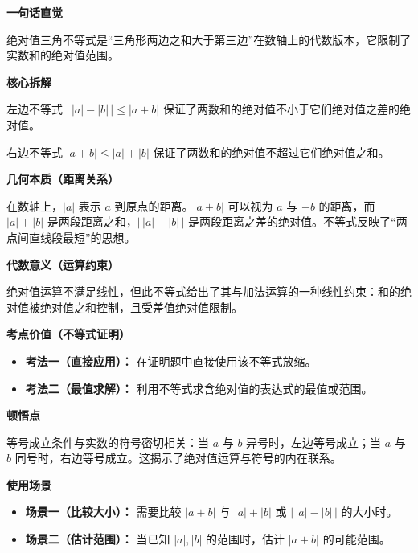 \begin{explanationbox}
\textbf{\textcolor{CExplanation}{一句话直觉}}

绝对值三角不等式是“三角形两边之和大于第三边”在数轴上的代数版本，它限制了实数和的绝对值范围。

\medskip
\textbf{\textcolor{CExplanation}{核心拆解}}
\begin{description}[style=nextline, leftmargin=2.8em, labelsep=0.5em, itemsep=0.45em]
    \item[\textbf{要点一（下界控制）：}] 左边不等式 $\bigl|\,|a| - |b|\,\bigr| \leq |a + b|$ 保证了两数和的绝对值不小于它们绝对值之差的绝对值。
    \item[\textbf{要点二（上界控制）：}] 右边不等式 $|a + b| \leq |a| + |b|$ 保证了两数和的绝对值不超过它们绝对值之和。
\end{description}

\medskip
\textbf{\textcolor{CExplanation}{几何本质（距离关系）}}

在数轴上，$|a|$ 表示 $a$ 到原点的距离。$|a+b|$ 可以视为 $a$ 与 $-b$ 的距离，而 $|a|+|b|$ 是两段距离之和，$\bigl|\,|a| - |b|\,\bigr|$ 是两段距离之差的绝对值。不等式反映了“两点间直线段最短”的思想。

\medskip
\textbf{\textcolor{CExplanation}{代数意义（运算约束）}}

绝对值运算不满足线性，但此不等式给出了其与加法运算的一种线性约束：和的绝对值被绝对值之和控制，且受差值绝对值限制。

\medskip
\textbf{\textcolor{CExplanation}{考点价值（不等式证明）}}
\begin{itemize}[leftmargin=*, itemsep=0.5em, topsep=0.4em]
    \item \textbf{考法一（直接应用）：} 在证明题中直接使用该不等式放缩。
    \item \textbf{考法二（最值求解）：} 利用不等式求含绝对值的表达式的最值或范围。
\end{itemize}

\medskip
\textbf{\textcolor{CExplanation}{顿悟点}}

等号成立条件与实数的符号密切相关：当 $a$ 与 $b$ 异号时，左边等号成立；当 $a$ 与 $b$ 同号时，右边等号成立。这揭示了绝对值运算与符号的内在联系。

\medskip
\textbf{\textcolor{CExplanation}{使用场景}}
\begin{itemize}[leftmargin=*, itemsep=0.5em, topsep=0.4em]
    \item \textbf{场景一（比较大小）：} 需要比较 $|a+b|$ 与 $|a|+|b|$ 或 $\bigl|\,|a| - |b|\,\bigr|$ 的大小时。
    \item \textbf{场景二（估计范围）：} 当已知 $|a|, |b|$ 的范围时，估计 $|a+b|$ 的可能范围。
\end{itemize}
\end{explanationbox}
